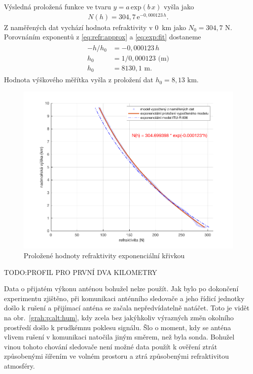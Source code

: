 \documentclass[twoside]{ctuthesis}
\newcommand{\mt}[1]{\text{#1}}
\theoremstyle{plain}
\theoremstyle{definition}
\theoremstyle{note}
\begin{document}
	Výsledná proložená funkce ve tvaru $y=a\,\mt{exp}(b\,x)$ vyšla jako
	\begin{align}
		N(h) = 304{,}7\,\mt{e}^{-0{,}000123\,h}.
		\label{eq:exp:fit}
	\end{align}
	Z naměřených dat vychází hodnota refraktivity v 0~km jako $N_\mt{0} = 304{,}7 \mt{ N}$. Porovnáním exponentů z \eqref{eq:refr:approx} a \eqref{eq:exp:fit} dostaneme
	\begin{align}
		\begin{split}
		-h/h_\mt{0} &= -0{,}000123\,h\\
		h_\mt{0} &= 1/0{,}000123 \mt{ (m)}\\
		h_\mt{0} &= 8130{,}1 \mt{ m}.
		\end{split}
	\end{align}
	Hodnota výškového měřítka vyšla z proložení dat $h_\mt{0} = 8{,}13 \mt{ km}$.
	\begin{figure}[hbtp]
		\centering
		\includegraphics[width=.7\textwidth]{Graphs/refractivity_meas_fit_model.pdf}
		\caption{Proložené hodnoty refraktivity exponenciální křivkou}
		\label{graph:refr:fit}
	\end{figure}

	TODO:PROFIL PRO PRVNÍ DVA KILOMETRY

	Data o přijatém výkonu anténou bohužel nelze použít. Jak bylo po dokončení experimentu zjištěno, při komunikaci anténního sledovače a jeho řídicí jednotky došlo k rušení a přijímací anténa se začala nepředvídatelně natáčet. Toto je vidět na obr.~\ref{grah:p:alt:hum}, kdy zcela bez jakýhkoliv výrazných změn okolního prostředí došlo k prudkémnu poklesu signálu. Šlo o moment, kdy se anténa vlivem rušení v komunikaci natočila jiným směrem, než byla sonda. Bohužel vinou tohoto chování sledovače není možné data použít k ověření ztrát způsobenými šířením ve volném prostoru a ztrá způsobenými refraktivitou atmosféry. 
\end{document}

